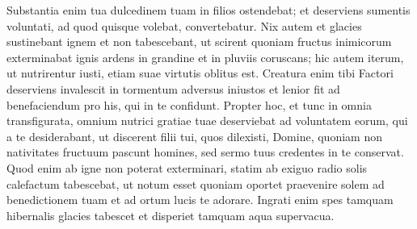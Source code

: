 \begin{biblechapter}
\verse Substantia enim tua dulcedinem tuam in filios ostendebat; et deserviens sumentis voluntati, ad quod quisque volebat, convertebatur. 
\verse Nix autem et glacies sustinebant ignem et non tabescebant, ut scirent quoniam fructus inimicorum exterminabat ignis ardens in grandine et in pluviis coruscans; 
\verse hic autem iterum, ut nutrirentur iusti, etiam suae virtutis oblitus est. 
\verse Creatura enim tibi Factori deserviens invalescit in tormentum adversus iniustos et lenior fit ad benefaciendum pro his, qui in te confidunt. 
\verse Propter hoc, et tunc in omnia transfigurata, omnium nutrici gratiae tuae deserviebat ad voluntatem eorum, qui a te desiderabant, 
\verse ut discerent filii tui, quos dilexisti, Domine, quoniam non nativitates fructuum pascunt homines, sed sermo tuus credentes in te conservat. 
\verse Quod enim ab igne non poterat exterminari, statim ab exiguo radio solis calefactum tabescebat, 
\verse ut notum esset quoniam oportet praevenire solem ad benedictionem tuam et ad ortum lucis te adorare. 
\verse Ingrati enim spes tamquam hibernalis glacies tabescet et disperiet tamquam aqua supervacua. 
\end{biblechapter}

